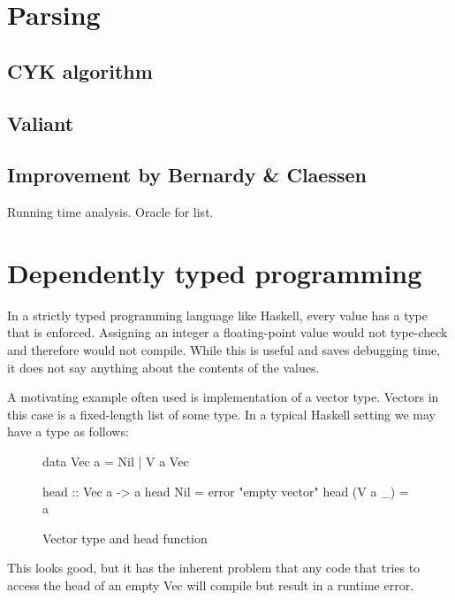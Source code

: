 \documentclass[a4paper,12pt,twosided]{report}
\begin{document}
\section{Parsing}
\subsection{CYK algorithm}
\subsection{Valiant}
\subsection{Improvement by Bernardy \& Claessen}
Running time analysis. Oracle for list.

\section{Dependently typed programming}
In a strictly typed programming language like Haskell, every value has a type
that is enforced. Assigning an integer a floating-point value would not
type-check and therefore would not compile. While this is useful and saves
debugging time, it does not say anything about the contents of the values.

A motivating example often used is implementation of a vector type. Vectors in
this case is a fixed-length list of some type. In a typical Haskell setting we 
may have a type as follows:
\begin{figure}[H]
\begin{code}
data Vec a = Nil | V a Vec

head :: Vec a -> a
head Nil = error "empty vector"
head (V a _) = a
\end{code}
\caption{Vector type and head function}
\end{figure}
This looks good, but it has the inherent problem that any code that tries to
access the head of an empty Vec will compile but result in a runtime error. 
\end{document}
